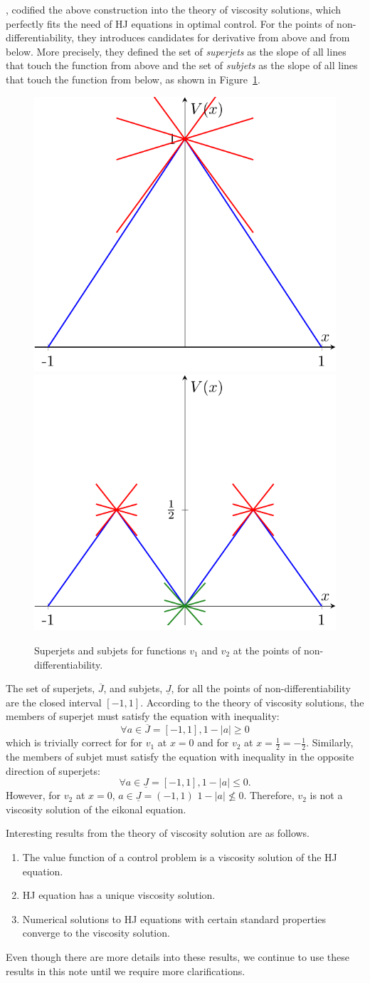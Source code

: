 \documentclass[11pt]{book}
\begin{document}
\citet{CIL92}, codified the above construction into the theory of viscosity solutions, which perfectly fits the need of HJ equations in optimal control. For the points of non-differentiability, they introduces candidates for  derivative from above and from below. More precisely, they defined the set of \emph{superjets} as the slope of all lines that touch the function from above and the set of \emph{subjets} as the slope of all lines that touch the function from below, as shown in Figure~\ref{fig:jets}.

\begin{figure}
    \centering
    \includegraphics[width=0.35\linewidth]{Control_lecture_notes/Figs/superjets.pdf}\includegraphics[width=0.35\linewidth]{Control_lecture_notes/Figs/jets.pdf}
    \caption{Superjets and subjets for functions $v_1$ and $v_2$ at the points of non-differentiability.}
    \label{fig:jets}
\end{figure}
The set of superjets, $\overline{J}$, and subjets, $\underline{J}$, for all the points of non-differentiability are the closed interval $[-1,1]$. According to the theory of viscosity solutions, the members of superjet must satisfy the equation with inequality:
\[
\forall a\in\overline{J}=[-1,1], 1-|a| \ge 0
\]
which is trivially correct for for $v_1$ at $x=0$ and for $v_2$ at $x=\frac12=-\frac12$.
Similarly,  the members of subjet must satisfy the equation with inequality in the opposite direction of superjets:
\[
\forall a\in\underline{J}=[-1,1], 1-|a| \le 0.
\]
However, for $v_2$ at $x=0$, $a\in\underline{J}=(-1,1)$ $1-|a| \not\le 0$. Therefore, $v_2$ is not a viscosity solution of the eikonal equation.

Interesting results from the theory of viscosity solution are as follows.
\begin{enumerate}[label=\arabic*)]
    \item The value function of a control problem is a viscosity solution of the HJ equation.
    \item HJ equation has a unique viscosity solution.
    \item Numerical solutions to HJ equations with certain standard properties converge to the viscosity solution.
\end{enumerate}
Even though there are more details into these results, we continue to use these results in this note until we require more clarifications.
\end{document}
